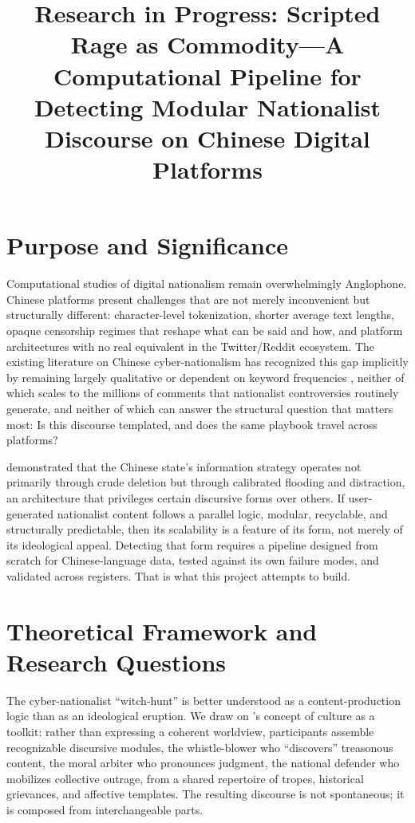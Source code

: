 \documentclass[man, 12pt, mask, floatsintext, nolmodern]{apa7}
\title{Research in Progress: Scripted Rage as Commodity---A Computational Pipeline for Detecting Modular Nationalist Discourse on Chinese Digital Platforms}
\begin{document}
\maketitle

\section{Purpose and Significance}

Computational studies of digital nationalism remain overwhelmingly Anglophone. Chinese platforms present challenges that are not merely inconvenient but structurally different: character-level tokenization, shorter average text lengths, opaque censorship regimes that reshape what can be said and how, and platform architectures with no real equivalent in the Twitter/Reddit ecosystem. The existing literature on Chinese cyber-nationalism has recognized this gap implicitly by remaining largely qualitative or dependent on keyword frequencies \parencite{repnikova2018, schneider2018}, neither of which scales to the millions of comments that nationalist controversies routinely generate, and neither of which can answer the structural question that matters most: Is this discourse templated, and does the same playbook travel across platforms?

\textcite{king2013, king2017} demonstrated that the Chinese state's information strategy operates not primarily through crude deletion but through calibrated flooding and distraction, an architecture that privileges certain discursive forms over others. If user-generated nationalist content follows a parallel logic, modular, recyclable, and structurally predictable, then its scalability is a feature of its form, not merely of its ideological appeal. Detecting that form requires a pipeline designed from scratch for Chinese-language data, tested against its own failure modes, and validated across registers. That is what this project attempts to build.

\section{Theoretical Framework and Research Questions}

The cyber-nationalist ``witch-hunt'' is better understood as a content-production logic than as an ideological eruption. We draw on \textcite{swidler1986}'s concept of culture as a toolkit: rather than expressing a coherent worldview, participants assemble recognizable discursive modules, the whistle-blower who ``discovers'' treasonous content, the moral arbiter who pronounces judgment, the national defender who mobilizes collective outrage, from a shared repertoire of tropes, historical grievances, and affective templates. The resulting discourse is not spontaneous; it is composed from interchangeable parts.
\end{document}
